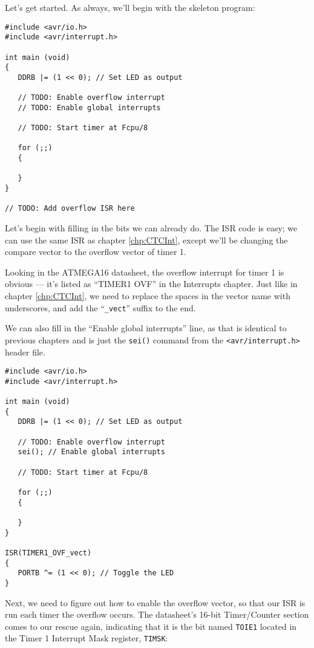 \documentclass[a4paper,oneside,notitlepage]{book}
\begin{document}
Let's get started. As always, we'll begin with the skeleton program:

\begin{center}
\begin{lstlisting}
#include <avr/io.h>
#include <avr/interrupt.h>

int main (void)
{
   DDRB |= (1 << 0); // Set LED as output

   // TODO: Enable overflow interrupt
   // TODO: Enable global interrupts

   // TODO: Start timer at Fcpu/8

   for (;;)
   {

   }
}

// TODO: Add overflow ISR here
\end{lstlisting}
\end{center}

Let's begin with filling in the bits we can already do. The ISR code is easy; we can use the same ISR as chapter \ref{chp:CTCInt}, except we'll be changing the compare vector to the overflow vector of timer 1.

Looking in the ATMEGA16 datasheet, the overflow interrupt for timer 1 is obvious --- it's listed as ``TIMER1 OVF'' in the Interrupts chapter. Just like in chapter \ref{chp:CTCInt}, we need to replace the spaces in the vector name with underscores, and add the ``\texttt{\_vect}'' suffix to the end.

We can also fill in the ``Enable global interrupts'' line, as that is identical to previous chapters and is just the \texttt{sei()} command from the \texttt{<avr/interrupt.h>} header file.

\begin{center}
\begin{lstlisting}
#include <avr/io.h>
#include <avr/interrupt.h>

int main (void)
{
   DDRB |= (1 << 0); // Set LED as output

   // TODO: Enable overflow interrupt
   sei(); // Enable global interrupts

   // TODO: Start timer at Fcpu/8

   for (;;)
   {

   }
}

ISR(TIMER1_OVF_vect)
{
   PORTB ^= (1 << 0); // Toggle the LED
}
\end{lstlisting}
\end{center}

Next, we need to figure out how to enable the overflow vector, so that our ISR is run each timer the overflow occurs. The datasheet's 16-bit Timer/Counter section comes to our rescue again, indicating that it is the bit named \texttt{TOIE1} located in the Timer 1 Interrupt Mask register, \texttt{TIMSK}:
\end{document}
